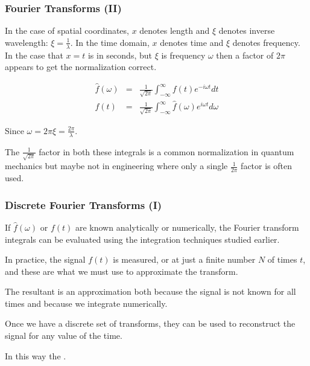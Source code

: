 \documentclass[hyperref={colorlinks=true}]{beamer}
\begin{document}
\begin{frame}%
  \frametitle{Fourier Transforms (II)}

  In the case of spatial coordinates, $x$ denotes length and $\xi$ denotes inverse wavelength: $\xi = \frac{1}{\lambda}$. In the time domain, $x$ denotes time and $\xi$ denotes frequency. In the case that $x=t$ is in seconds, but $\xi$ is  frequency $\omega$ then a factor of $2\pi$ appears to get the normalization correct.
  
  \begin{eqnarray}
    \hat{f}(\omega) &=& \frac{1}{\sqrt{2\pi}} \int_{-\infty}^{\infty} f(t) e^{-i\omega t} dt \\
    f(t)            &=& \frac{1}{\sqrt{2\pi}} \int_{-\infty}^{\infty} \hat{f}(\omega) e^{i \omega t } d\omega
  \end{eqnarray}

  Since $\omega = 2\pi \xi = \frac{2\pi}{\lambda}$.
  
  \mysp
  
  The $\frac{1}{\sqrt{2\pi}}$ factor in both these integrals is a common normalization in quantum mechanics but maybe not in engineering where only a single $\frac{1}{2\pi}$ factor is often used.
  
\end{frame}


\begin{frame}%
  \frametitle{Discrete Fourier Transforms (I)}

  If $\hat{f}(\omega)$ or $f(t)$ are known analytically or numerically, the Fourier transform integrals can be evaluated using the integration techniques studied earlier. 
  
  \mysp \pause
  
  In practice, the signal $f(t)$  is measured, or  at just a finite number $N$ of times $t$, and these are what we must use to approximate the transform. 
  
  \mysp \pause
  
  The resultant  is an approximation both because the signal is not known for all times and because we integrate numerically.
  
  \mysp \pause
  
  Once we have a discrete set of transforms, they can be used to reconstruct the signal for any value of the time. 
  
  \mysp \pause
  
  In this way the .
  
\end{frame}
\end{document}
